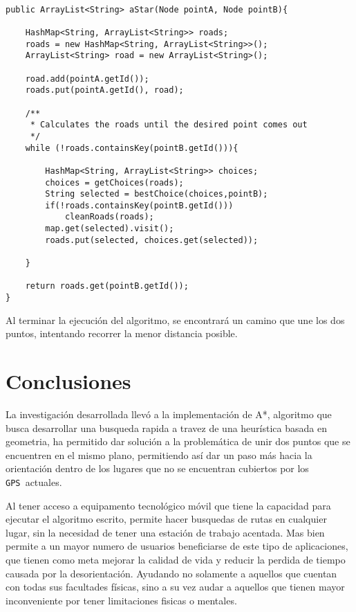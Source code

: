 \documentclass[journal]{IEEEtran}
\newcommand{\gp}{\texttt{GPS~}}
\begin{document}
\lstset{language=Java, tabsize=1, showstringspaces=true}
\begin{scriptsize}\ttfamily\begin{lstlisting}
	
public ArrayList<String> aStar(Node pointA, Node pointB){
	
	HashMap<String, ArrayList<String>> roads;
	roads = new HashMap<String, ArrayList<String>>();
	ArrayList<String> road = new ArrayList<String>();

	road.add(pointA.getId());
	roads.put(pointA.getId(), road);
		
	/**
	 * Calculates the roads until the desired point comes out
	 */
	while (!roads.containsKey(pointB.getId())){
					
		HashMap<String, ArrayList<String>> choices; 
		choices = getChoices(roads);
		String selected = bestChoice(choices,pointB);
		if(!roads.containsKey(pointB.getId()))
			cleanRoads(roads);
		map.get(selected).visit();
		roads.put(selected, choices.get(selected));
		
	}
		
	return roads.get(pointB.getId());
}  
\end{lstlisting}\end{scriptsize}
Al terminar la ejecución del algoritmo, se encontrará un camino que une los dos puntos, intentando recorrer la menor distancia posible.

\section{Conclusiones}
La investigación desarrollada llevó a la implementación de A*, algoritmo que busca desarrollar una busqueda rapida a travez de una heurística basada en geometria, ha permitido dar solución a la problemática de unir dos puntos que se encuentren en el mismo plano, permitiendo así dar un paso más hacia la orientación dentro de los lugares que no se encuentran cubiertos por los \gp actuales.

Al tener acceso a equipamento tecnológico móvil que tiene la capacidad para ejecutar el algoritmo escrito, permite hacer busquedas de rutas en cualquier lugar, sin la necesidad de tener una estación de trabajo acentada. Mas bien permite a un mayor numero de usuarios beneficiarse de este tipo de aplicaciones, que tienen como meta mejorar la calidad de vida y reducir la perdida de tiempo causada por la desorientación. Ayudando no solamente a aquellos que cuentan con todas sus facultades físicas, sino a su vez audar a aquellos que tienen mayor inconveniente por tener limitaciones fisicas o mentales.
\end{document}
